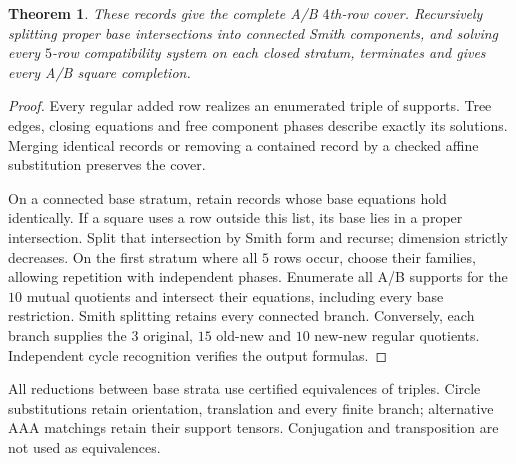 \documentclass[11pt,a4paper]{article}
\newtheorem{theorem}{Theorem}[section]
\theoremstyle{plain}
\theoremstyle{definition}
\numberwithin{equation}{section}
\begin{document}
\begin{theorem}\label{lem:fullrowcover}\label{prop:closedstrata}\label{thm:fullcompletionprocedure}
These records give the complete A/B $4$th-row cover. Recursively splitting proper base intersections into connected Smith components, and solving every $5$-row compatibility system on each closed stratum, terminates and gives every A/B square completion.
\end{theorem}
\begin{proof}
Every regular added row realizes an enumerated triple of supports. Tree edges, closing equations and free component phases describe exactly its solutions. Merging identical records or removing a contained record by a checked affine substitution preserves the cover.

On a connected base stratum, retain records whose base equations hold identically. If a square uses a row outside this list, its base lies in a proper intersection. Split that intersection by Smith form and recurse; dimension strictly decreases. On the first stratum where all $5$ rows occur, choose their families, allowing repetition with independent phases. Enumerate all A/B supports for the $10$ mutual quotients and intersect their equations, including every base restriction. Smith splitting retains every connected branch. Conversely, each branch supplies the $3$ original, $15$ old-new and $10$ new-new regular quotients. Independent cycle recognition verifies the output formulas.
\end{proof}
All reductions between base strata use certified equivalences of triples. Circle substitutions retain orientation, translation and every finite branch; alternative AAA matchings retain their support tensors. Conjugation and transposition are not used as equivalences.
\end{document}
